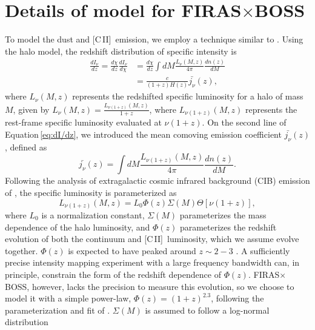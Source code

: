 \documentclass[fleqn,usenatbib]{mnras}
\newcommand{\cii}{[C{\sc\,II}]}
\newcommand*\mean[1]{\bar{#1}}
\newcommand{\FB}{FIRAS${\times}$BOSS}
\begin{document}
\section{Details of model for \texorpdfstring{\FB}{FIRASxBOSS}}
\label{sec:Appendix_A}

To model the dust and \cii\ emission, we employ a technique similar to \cite{pullen2018search}.  Using the halo model, the redshift distribution of 
specific intensity is 
\begin{equation}\label{eq:dI/dz}
\begin{split}
\frac{dI_{\nu}}{dz} = \frac{d\chi}{dz} \frac{dI_{\nu}}{d\chi} &= \frac{d\chi}{dz} \int dM %
\frac{L_{\nu}(M,z) }{4\pi}\frac{dn(z)}{dM}\\
&= \frac{c}{(1+z)H(z)}\mean{j_{\nu}}(z),
\end{split}
\end{equation}
where $L_{\nu}(M,z)$ represents the redshifted specific luminosity for a halo of mass $M$, given by $L_{\nu}(M,z) = \frac{L_{\nu(1+z)}(M,z)}{1+z}$, where $L_{\nu(1+z)}(M,z)$ represents the rest-frame specific luminosity evaluated at $\nu(1+z)$. On the second line of Equation\,\ref{eq:dI/dz}, we introduced the mean comoving emission coefficient $\mean{j_{\nu}}(z)$, defined as
\begin{equation}
\mean{j_{\nu}}(z) = \int dM \frac{L_{\nu(1+z)}(M,z)}{4\pi}\frac{dn(z)}{dM}.
\end{equation}
Following the analysis of extragalactic cosmic infrared background (CIB) emission of \cite{10.1111/j.1365-2966.2012.20510.x}, the specific luminosity is parameterized as
\begin{equation}\label{eq:shang_parametrization}
L_{\nu(1+z)}(M,z) = L_0 \Phi(z) \Sigma(M)\Theta \left[ \nu(1+z)\right],
\end{equation}
where $L_0$ is a normalization constant, $\Sigma(M)$ parameterizes the mass dependence of the halo luminosity, and $\Phi(z)$ parameterizes the redshift evolution of both the continuum and \cii\ luminosity, which we assume evolve together. $\Phi(z)$ is expected to have peaked around $z\sim2-3$ \citep{Madau2014}. A sufficiently precise intensity mapping experiment with a large frequency bandwidth can, in principle, constrain the form of the redshift dependence of $\Phi(z)$. \FB, however, lacks the precision to measure this evolution, so we choose to model it with a simple power-law, $\Phi(z) = (1+z)^{2.3}$, following the parameterization and fit of \cite{pullen2018search}. $\Sigma(M)$ is assumed to follow a log-normal distribution
\end{document}

